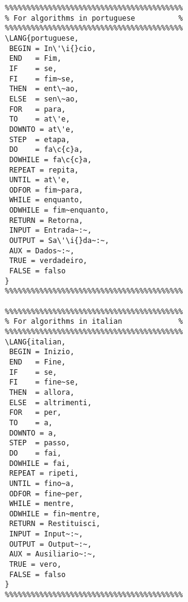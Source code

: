 \documentclass{article}
\begin{document}
\begin{verbatim}
%%%%%%%%%%%%%%%%%%%%%%%%%%%%%%%%%%%%%%%%%
% For algorithms in portuguese          %
%%%%%%%%%%%%%%%%%%%%%%%%%%%%%%%%%%%%%%%%%
\LANG{portuguese,
 BEGIN = In\'\i{}cio,
 END   = Fim,
 IF    = se,
 FI    = fim~se,
 THEN  = ent\~ao,
 ELSE  = sen\~ao,
 FOR   = para,
 TO    = at\'e,
 DOWNTO = at\'e,
 STEP  = etapa,
 DO    = fa\c{c}a,
 DOWHILE = fa\c{c}a,
 REPEAT = repita,
 UNTIL = at\'e,
 ODFOR = fim~para,
 WHILE = enquanto,
 ODWHILE = fim~enquanto,
 RETURN = Retorna,
 INPUT = Entrada~:~,
 OUTPUT = Sa\'\i{}da~:~,
 AUX = Dados~:~,
 TRUE = verdadeiro,
 FALSE = falso
}
%%%%%%%%%%%%%%%%%%%%%%%%%%%%%%%%%%%%%%%%%

%%%%%%%%%%%%%%%%%%%%%%%%%%%%%%%%%%%%%%%%%
% For algorithms in italian             %
%%%%%%%%%%%%%%%%%%%%%%%%%%%%%%%%%%%%%%%%%
\LANG{italian,
 BEGIN = Inizio,
 END   = Fine,
 IF    = se,
 FI    = fine~se,
 THEN  = allora,
 ELSE  = altrimenti,
 FOR   = per,
 TO    = a,
 DOWNTO = a,
 STEP  = passo,
 DO    = fai,
 DOWHILE = fai,
 REPEAT = ripeti,
 UNTIL = fino~a,
 ODFOR = fine~per,
 WHILE = mentre,
 ODWHILE = fin~mentre,
 RETURN = Restituisci,
 INPUT = Input~:~,
 OUTPUT = Output~:~,
 AUX = Ausiliario~:~,
 TRUE = vero,
 FALSE = falso
}
%%%%%%%%%%%%%%%%%%%%%%%%%%%%%%%%%%%%%%%%%
\end{verbatim}
\end{document}
